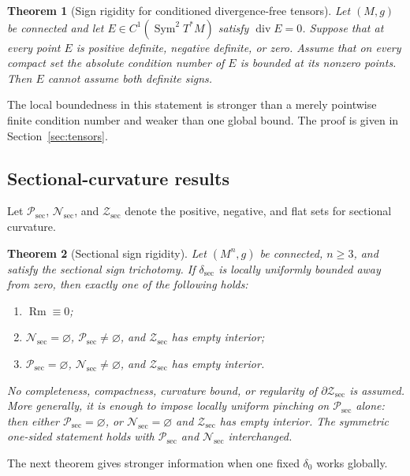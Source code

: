 \documentclass[11pt,reqno]{amsart}
\newtheorem{theorem}{Theorem}[section]
\theoremstyle{definition}
\theoremstyle{remark}
\newcommand{\Rm}{\operatorname{Rm}}
\newcommand{\diver}{\operatorname{div}}
\newcommand{\cP}{\mathcal P}
\newcommand{\cN}{\mathcal N}
\newcommand{\cZ}{\mathcal Z}
\newcommand{\dsec}{\delta_{\mathrm{sec}}}
\begin{document}
\begin{theorem}[Sign rigidity for conditioned divergence-free tensors]\label{thm:tensor-intro}
Let $(M,g)$ be connected and let $E\in C^1(\operatorname{Sym}^2T^*M)$ satisfy $\diver E=0$.  Suppose that at every point $E$ is positive definite, negative definite, or zero.  Assume that on every compact set the absolute condition number of $E$ is bounded at its nonzero points.  Then $E$ cannot assume both definite signs.
\end{theorem}

The local boundedness in this statement is stronger than a merely pointwise finite condition number and weaker than one global bound.  The proof is given in Section~\ref{sec:tensors}.

\subsection{Sectional-curvature results}

Let $\cP_{\mathrm{sec}}$, $\cN_{\mathrm{sec}}$, and $\cZ_{\mathrm{sec}}$ denote the positive, negative, and flat sets for sectional curvature.

\begin{theorem}[Sectional sign rigidity]\label{thm:sectional-intro}
Let $(M^n,g)$ be connected, $n\ge3$, and satisfy the sectional sign trichotomy.  If $\dsec$ is locally uniformly bounded away from zero, then exactly one of the following holds:
\begin{enumerate}[label=(\alph*)]
\item $\Rm\equiv0$;
\item $\cN_{\mathrm{sec}}=\varnothing$, $\cP_{\mathrm{sec}}\ne\varnothing$, and $\cZ_{\mathrm{sec}}$ has empty interior;
\item $\cP_{\mathrm{sec}}=\varnothing$, $\cN_{\mathrm{sec}}\ne\varnothing$, and $\cZ_{\mathrm{sec}}$ has empty interior.
\end{enumerate}
No completeness, compactness, curvature bound, or regularity of $\partial\cZ_{\mathrm{sec}}$ is assumed.  More generally, it is enough to impose locally uniform pinching on $\cP_{\mathrm{sec}}$ alone: then either $\cP_{\mathrm{sec}}=\varnothing$, or $\cN_{\mathrm{sec}}=\varnothing$ and $\cZ_{\mathrm{sec}}$ has empty interior.  The symmetric one-sided statement holds with $\cP_{\mathrm{sec}}$ and $\cN_{\mathrm{sec}}$ interchanged.
\end{theorem}

The next theorem gives stronger information when one fixed $\delta_0$ works globally.
\end{document}
